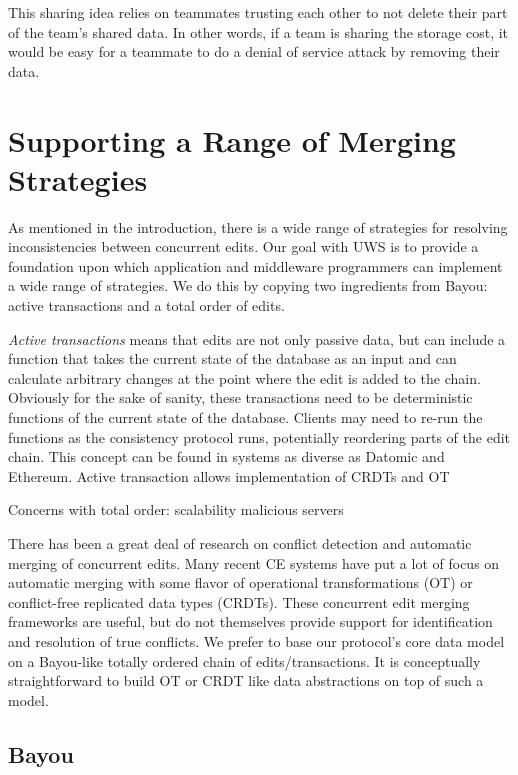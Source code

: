 \documentclass[runningheads]{llncs}
\begin{document}
This sharing idea relies on teammates trusting each other to not delete their part of the team's shared data.
In other words, if a team is sharing the storage cost, it would be easy for a teammate to do a denial of service attack by removing their data.

\section{Supporting a Range of Merging Strategies}

As mentioned in the introduction, there is a wide range of strategies for resolving inconsistencies between concurrent edits.
Our goal with UWS is to provide a foundation upon which application and middleware programmers can implement a wide range of strategies.
We do this by copying two ingredients from Bayou: active transactions and a total order of edits.

\emph{Active transactions} means that edits are not only passive data, but can include a function that takes the current state of the database as an input and can calculate arbitrary changes at the point where the edit is added to the chain.
Obviously for the sake of sanity, these transactions need to be deterministic functions of the current state of the database.
Clients may need to re-run the functions as the consistency protocol runs, potentially reordering parts of the edit chain.
This concept can be found in systems as diverse as Datomic and Ethereum.
Active transaction allows implementation of CRDTs and OT

Concerns with total order:
scalability
malicious servers

There has been a great deal of research on conflict detection and automatic merging of concurrent edits.
Many recent CE systems have put a lot of focus on automatic merging with some flavor of operational transformations (OT) or conflict-free replicated data types (CRDTs).
These concurrent edit merging frameworks are useful, but do not themselves provide support for identification and resolution of true conflicts.
We prefer to base our protocol's core data model on a Bayou-like totally ordered chain of edits{\slash}transactions.
It is conceptually straightforward to build OT or CRDT like data abstractions on top of such a model.

\subsection{Bayou}
\end{document}
